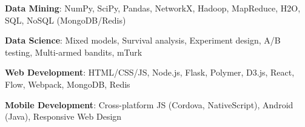 \documentclass[margin,line]{resume}
\begin{document}
\begin{resume}
\vspace{-4mm}


\textbf{Data Mining}: NumPy, SciPy, Pandas, NetworkX, Hadoop, MapReduce, H2O, SQL, NoSQL (MongoDB/Redis) %

\vspace{-4mm}

\textbf{Data Science}: Mixed models, Survival analysis, Experiment design, A/B testing, Multi-armed bandits, mTurk %


\vspace{-4mm}


\textbf{Web Development}: HTML/CSS/JS, Node.js, Flask, Polymer, D3.js, React, Flow, Webpack, MongoDB, Redis %

\vspace{-4mm}

\textbf{Mobile Development}: Cross-platform JS (Cordova, NativeScript), Android (Java), Responsive Web Design









\end{resume}
\end{document}
